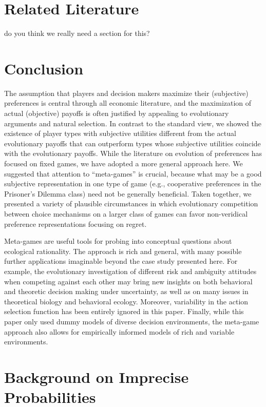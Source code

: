 \documentclass[fleqn,reqno,12pt]{article}
\theoremstyle{Satz}
\theoremstyle{Bsp}
\begin{document}
\section{Related Literature}

do you think we really need a section for this?


\section{Conclusion} \label{sec:conclusion}


The assumption that players and decision makers maximize their (subjective) preferences is central through all economic literature, and the maximization of actual (objective) payoffs is often justified by appealing to evolutionary arguments and natural
selection. In contrast to the standard view, we showed the
existence of player types with subjective utilities different
from the actual evolutionary payoffs that can outperform types whose
subjective utilities coincide with the evolutionary payoffs.
While the literature on evolution of preferences has focused
on fixed games, we have adopted a
more general approach here. We suggested that attention
to “meta-games” is crucial, because what may be a good
subjective representation in one type of game (e.g., cooperative preferences in the Prisoner’s Dilemma class) need not
be generally beneficial. Taken together, we presented a variety of plausible circumstances in which evolutionary competition between choice
mechanisms on a larger class of games can favor non-veridical preference representations focusing on regret.

Meta-games are useful tools for probing into conceptual questions about ecological
rationality. The approach is rich and general, with many possible further
applications imaginable beyond the case study presented here. For example, the evolutionary
investigation of different risk and ambiguity attitudes when competing against each other may bring new insights on both behavioral and theoretic
decision making under uncertainty, as well as on many issues in theoretical biology and
behavioral ecology. Moreover, variability in the action selection function has been entirely
ignored in this paper. Finally, while this paper only used dummy models of diverse decision
environments, the meta-game approach also allows for empirically informed models of rich and
variable environments.


\appendix

\iffalse
\section{Background on Imprecise Probabilities}
\label{sec:impr-prob-beli}
\end{document}
